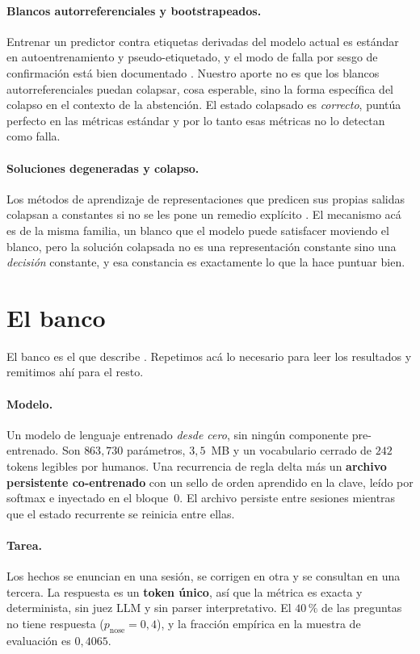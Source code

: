 \documentclass[11pt,a4paper]{article}
\begin{document}
\paragraph{Blancos autorreferenciales y bootstrapeados.} Entrenar un predictor contra etiquetas
derivadas del modelo actual es estándar en autoentrenamiento y pseudo-etiquetado, y el modo de falla
por sesgo de confirmación está bien documentado \citep{arazo2020pseudo}. Nuestro aporte no es que los
blancos autorreferenciales puedan colapsar, cosa esperable, sino la forma específica del colapso en el
contexto de la abstención. El estado colapsado es \emph{correcto}, puntúa perfecto en las métricas
estándar y por lo tanto esas métricas no lo detectan como falla.

\paragraph{Soluciones degeneradas y colapso.} Los métodos de aprendizaje de representaciones que
predicen sus propias salidas colapsan a constantes si no se les pone un remedio explícito
\citep{grill2020byol, chen2021simsiam}. El mecanismo acá es de la misma familia, un blanco que el
modelo puede satisfacer moviendo el blanco, pero la solución colapsada no es una representación
constante sino una \emph{decisión} constante, y esa constancia es exactamente lo que la hace puntuar
bien.

\section{El banco}
\label{sec:bench}

El banco es el que describe \citet{speranza2026abstention}. Repetimos acá lo necesario para leer los
resultados y remitimos ahí para el resto.

\paragraph{Modelo.} Un modelo de lenguaje entrenado \emph{desde cero}, sin ningún componente
pre-entrenado. Son $863{,}730$ parámetros, $3{,}5$~MB y un vocabulario cerrado de $242$ tokens
legibles por humanos. Una recurrencia de regla delta más un \textbf{archivo persistente co-entrenado}
con un sello de orden aprendido en la clave, leído por softmax e inyectado en el bloque~0. El archivo
persiste entre sesiones mientras que el estado recurrente se reinicia entre ellas.

\paragraph{Tarea.} Los hechos se enuncian en una sesión, se corrigen en otra y se consultan en una
tercera. La respuesta es un \textbf{token único}, así que la métrica es exacta y determinista, sin juez
LLM y sin parser interpretativo. El $40\,\%$ de las preguntas no tiene respuesta
($p_{\mathrm{nose}} = 0{,}4$), y la fracción empírica en la muestra de evaluación es $0{,}4065$.
\end{document}
